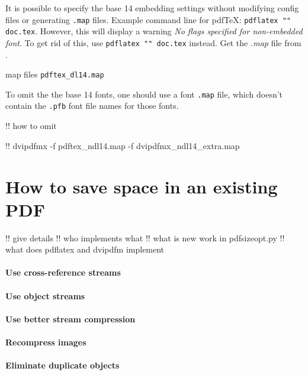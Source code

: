 \documentclass{ltugproc}
\begin{document}
It is possible to specify the base 14 embedding settings without modifying
config files or generating \texttt{.map} files. Example command line for
pdf\TeX{}: \texttt{pdflatex "" doc.tex}.
However, this will display a warning \emph{No flags specified for
non-embedded font}. To get rid of this, use
\texttt{pdflatex "" doc.tex}
instead. Get the \emph{.map} file from \cite{pdfsizeopt-extra}.




map files \texttt{pdftex_dl14.map}

To omit the the base 14 fonts, one should use a font \texttt{.map} file, which
doesn't contain the \texttt{.pfb} font file names for those fonts.



!! how to omit 

!! dvipdfmx -f pdftex\_ndl14.map -f dvipdfmx\_ndl14_extra.map



\section{How to save space in an existing PDF}

!! give details
!! who implements what
!! what is new work in pdfsizeopt.py
!! what does pdflatex and dvipdfm implement

\paragraph{Use cross-reference streams}

\paragraph{Use object streams}

\paragraph{Use better stream compression}

\paragraph{Recompress images}

\paragraph{Eliminate duplicate objects}
\end{document}
